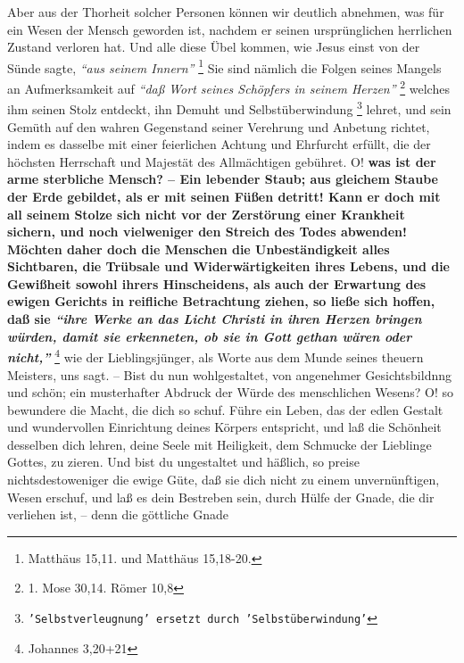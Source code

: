 Aber aus der Thorheit solcher Personen können wir deutlich abnehmen, was für ein
Wesen der Mensch geworden ist, nachdem er seinen ursprünglichen herrlichen
Zustand verloren hat. Und alle diese Übel kommen, wie Jesus einst von der
Sünde
sagte,
\textit{"`aus seinem Innern"'}
\footnote{Matthäus 15,11. und Matthäus 15,18-20.}
Sie sind nämlich
die Folgen seines Mangels an Aufmerksamkeit auf
\textit{"`daß Wort seines Schöpfers in
seinem Herzen"'}
\footnote{1. Mose 30,14. Römer 10,8}
welches ihm seinen Stolz
entdeckt, ihn Demuht und
Selbstüberwindung
\footnote{\texttt{'Selbstverleugnung' ersetzt durch 'Selbstüberwindung'}}
lehret, und sein Gemüth auf den
wahren Gegenstand seiner Verehrung und Anbetung richtet, indem es dasselbe mit
einer feierlichen Achtung und Ehrfurcht erfüllt, die der höchsten Herrschaft und
Majestät des Allmächtigen gebühret. O!  
 \label{ref:11_10_juengstes_gericht}
\textbf{was ist der arme sterbliche Mensch? --
Ein lebender Staub; aus gleichem Staube der Erde gebildet, als er mit seinen
Füßen detritt! Kann er doch mit all seinem Stolze sich nicht vor der Zerstörung
einer Krankheit sichern, und noch vielweniger den Streich des Todes abwenden!
Möchten daher doch die Menschen die Unbeständigkeit alles Sichtbaren, die
Trübsale und Widerwärtigkeiten ihres Lebens, und die Gewißheit sowohl ihrers
Hinscheidens, als auch der Erwartung des ewigen Gerichts in reifliche
Betrachtung ziehen, so ließe sich hoffen, daß sie
\textit{"`ihre Werke an das Licht
Christi in ihren Herzen bringen würden, damit sie erkenneten, ob sie in Gott
gethan wären oder nicht,"'} }
\footnote{Johannes 3,20+21}
wie der Lieblingsjünger, als
Worte aus dem Munde seines theuern Meisters, uns sagt. -- Bist du nun
wohlgestaltet, von angenehmer Gesichtsbildnng und schön; ein musterhafter
Abdruck der Würde des menschlichen Wesens? O! so bewundere die Macht, die dich
so schuf. Führe ein Leben, das der edlen Gestalt und wundervollen Einrichtung
deines Körpers entspricht, und laß die Schönheit desselben dich lehren, deine
Seele mit Heiligkeit, dem Schmucke der
Lieblinge Gottes, zu zieren. Und bist du
ungestaltet und häßlich, so preise nichtsdestoweniger die ewige Güte, daß sie
dich nicht zu einem unvernünftigen, Wesen erschuf, und laß es dein Bestreben
sein, durch Hülfe der Gnade, die dir verliehen ist, --  denn die
göttliche Gnade
